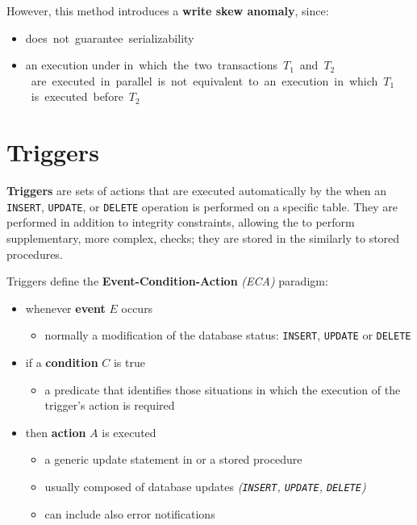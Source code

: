 \documentclass[english]{article}
\begin{document}
\bigskip
However, this method introduces a \textbf{write skew anomaly}, since:

\begin{itemize}
  \item \si does not guarantee serializability
  \item an execution under \si in which the two transactions \(T_1\) and \(T_2\) are executed in parallel is not equivalent to an execution in which \(T_1\) is executed before \(T_2\)
\end{itemize}

\clearpage

\section{Triggers}

\textbf{Triggers} are sets of actions that are executed automatically by the \dbms when an \texttt{INSERT}, \texttt{UPDATE}, or \texttt{DELETE} operation is performed on a specific table.
They are performed in addition to integrity constraints, allowing the \dbms to perform supplementary, more complex, checks;
they are stored in the \dbms similarly to stored procedures.

Triggers define the \textbf{Event-Condition-Action} \textit{(ECA)} paradigm:

\begin{itemize}
  \item whenever \textbf{event} \(E\) occurs
        \begin{itemize}[label=\(\rightarrow\)]
          \item normally a modification of the database status: \texttt{INSERT}, \texttt{UPDATE} or \texttt{DELETE}
        \end{itemize}
  \item if a \textbf{condition} \(C\) is true
        \begin{itemize}[label=\(\rightarrow\)]
          \item a predicate that identifies those situations in which the execution of the trigger's action is required
        \end{itemize}
  \item then \textbf{action} \(A\) is executed
        \begin{itemize}[label=\(\rightarrow\)]
          \item a generic update statement in or a stored procedure
          \item usually composed of database updates \textit{(\texttt{INSERT}, \texttt{UPDATE}, \texttt{DELETE})}
          \item can include also error notifications
        \end{itemize}
\end{itemize}
\end{document}
